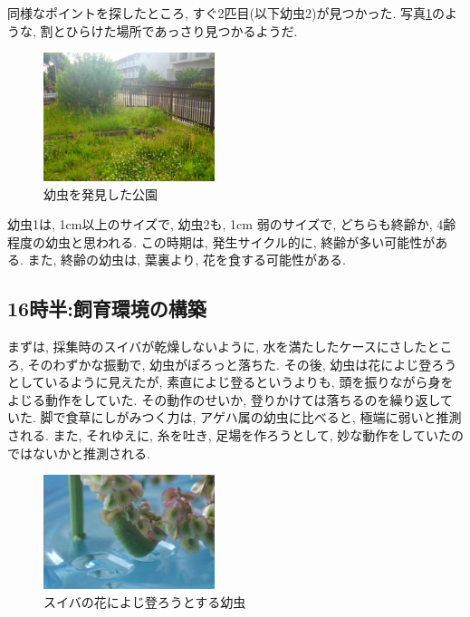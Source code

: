 \documentclass{jsarticle}
\begin{document}
同様なポイントを探したところ, すぐ2匹目(以下幼虫2)が見つかった. 
写真\ref{pic-field}のような, 割とひらけた場所であっさり見つかるようだ. 
\begin{figure}[htbp]
  \begin{center}
    \includegraphics[width=5cm]{photo/park.JPG}
  \end{center}
  \caption{幼虫を発見した公園}
  \label{pic-field}
\end{figure}
幼虫1は, 1cm以上のサイズで, 幼虫2も, 1cm 弱のサイズで, どちらも終齢か, 4齢程度の幼虫と思われる. 
この時期は, 発生サイクル的に, 終齢が多い可能性がある. また, 終齢の幼虫は, 葉裏より, 花を食する可能性がある. 

\subsection{16時半:飼育環境の構築}
まずは, 採集時のスイバが乾燥しないように, 水を満たしたケースにさしたところ, そのわずかな振動で, 幼虫がぽろっと落ちた. 
その後, 幼虫は花によじ登ろうとしているように見えたが, 素直によじ登るというよりも, 頭を振りながら身をよじる動作をしていた. その動作のせいか, 登りかけては落ちるのを繰り返していた. 
脚で食草にしがみつく力は, アゲハ属の幼虫に比べると, 極端に弱いと推測される. 
また, それゆえに, 糸を吐き, 足場を作ろうとして, 妙な動作をしていたのではないかと推測される. 
\begin{figure}[htbp]
  \begin{center}
    \includegraphics[width=5cm]{photo/try_to_climb.JPG}
    \caption{スイバの花によじ登ろうとする幼虫}
    \label{pic-try-to-climb}
  \end{center}
\end{figure}
\end{document}
